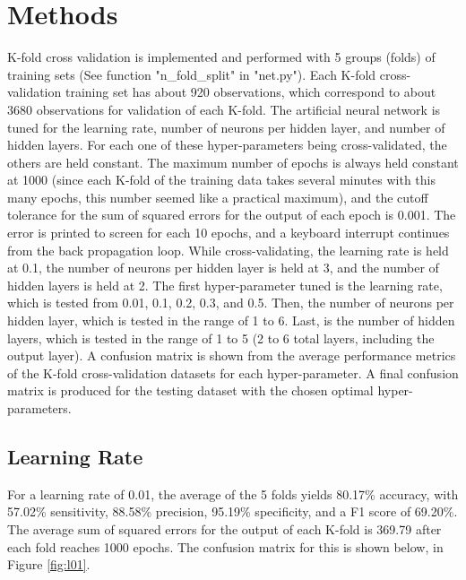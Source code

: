 \documentclass[tikz]{article}
\begin{document}
\section{Methods}
\label{sec:methods}
K-fold cross validation is implemented and performed with 5 groups (folds) of training sets (See function "n\_fold\_split" in "net.py"). Each K-fold cross-validation training set has about 920 observations, which correspond to about 3680 observations for validation of each K-fold. The artificial neural network is tuned for the learning rate, number of neurons per hidden layer, and number of hidden layers. For each one of these hyper-parameters being cross-validated, the others are held constant. The maximum number of epochs is always held constant at 1000 (since each K-fold of the training data takes several minutes with this many epochs, this number seemed like a practical maximum), and the cutoff tolerance for the sum of squared errors for the output of each epoch is 0.001. The error is printed to screen for each 10 epochs, and a keyboard interrupt continues from the back propagation loop. While cross-validating, the learning rate is held at 0.1, the number of neurons per hidden layer is held at 3, and the number of hidden layers is held at 2. The first hyper-parameter tuned is the learning rate, which is tested from 0.01, 0.1, 0.2, 0.3,  and 0.5. Then, the number of neurons per hidden layer, which is tested in the range of 1 to 6. Last, is the number of hidden layers, which is tested in the range of 1 to 5 (2 to 6 total layers, including the output layer). A confusion matrix is shown from the average performance metrics of the K-fold cross-validation datasets for each hyper-parameter. A final confusion matrix is produced for the testing dataset with the chosen optimal hyper-parameters. \\

\subsection{Learning Rate}
\label{sec:hyper1}
For a learning rate of 0.01, the average of the 5 folds yields 80.17\% accuracy, with 57.02\% sensitivity, 88.58\% precision, 95.19\% specificity, and a F1 score of 69.20\%. The average sum of squared errors for the output of each K-fold is 369.79 after each fold reaches 1000 epochs. The confusion matrix for this is shown below, in Figure \ref{fig:l01}.
\end{document}
